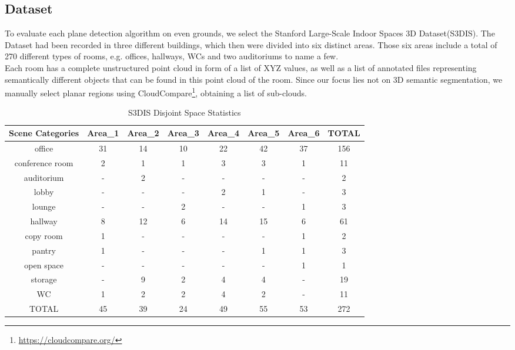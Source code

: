 \documentclass[main.tex]{subfiles}
\begin{document}
\subsection{Dataset}
To evaluate each plane detection algorithm on even grounds, we select the Stanford Large-Scale Indoor Spaces 3D Dataset(S3DIS)\cite{2017arXiv170201105A}. The Dataset had been recorded in three different buildings,
which then were divided into six distinct areas. Those six areas include a total of 270 different types of rooms, e.g. offices, hallways, WCs and two auditoriums to name a few.\\
Each room has a complete unstructured point cloud in form of a list of XYZ values, as well as a list of annotated files representing semantically different objects that can be found in this point cloud
of the room.
Since our focus lies not on 3D semantic segmentation, we manually select planar regions using CloudCompare\footnote{\href{https://cloudcompare.org/}{https://cloudcompare.org/}}, obtaining a list of sub-clouds.

\begin{table}[]
    \centering
    \begin{tabular}{c|c|c|c|c|c|c|c}
        \hline
        Scene Categories & Area\_1 & Area\_2 & Area\_3 & Area\_4 & Area\_5 & Area\_6 & TOTAL \\ \hline
        office           & 31      & 14      & 10      & 22      & 42      & 37      & 156   \\ \hline
        conference room  & 2       & 1       & 1       & 3       & 3       & 1       & 11    \\ \hline
        auditorium       & -       & 2       & -       & -       & -       & -       & 2     \\ \hline
        lobby            & -       & -       & -       & 2       & 1       & -       & 3     \\ \hline
        lounge           & -       & -       & 2       & -       & -       & 1       & 3     \\ \hline
        hallway          & 8       & 12      & 6       & 14      & 15      & 6       & 61    \\ \hline
        copy room        & 1       & -       & -       & -       & -       & 1       & 2     \\ \hline
        pantry           & 1       & -       & -       & -       & 1       & 1       & 3     \\ \hline
        open space       & -       & -       & -       & -       & -       & 1       & 1     \\ \hline
        storage          & -       & 9       & 2       & 4       & 4       & -       & 19    \\ \hline
        WC               & 1       & 2       & 2       & 4       & 2       & -       & 11    \\ \hline
        TOTAL            & 45      & 39      & 24      & 49      & 55      & 53      & 272   \\
    \end{tabular}
    \caption{S3DIS Disjoint Space Statistics}
    \label{tab:stanfordStats}
\end{table}
\end{document}
